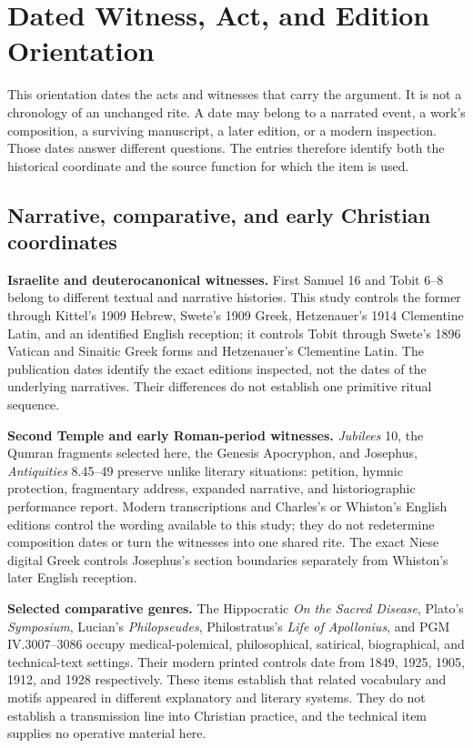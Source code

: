 \section{Dated Witness, Act, and Edition Orientation}

This orientation dates the acts and witnesses that carry the argument. It is
not a chronology of an unchanged rite. A date may belong to a narrated event,
a work's composition, a surviving manuscript, a later edition, or a modern
inspection. Those dates answer different questions. The entries therefore
identify both the historical coordinate and the source function for which the
item is used.

\subsection{Narrative, comparative, and early Christian coordinates}

\noindent\textbf{Israelite and deuterocanonical witnesses.}
First Samuel 16 and Tobit 6--8 belong to different textual and narrative
histories. This study controls the former through Kittel's 1909 Hebrew,
Swete's 1909 Greek, Hetzenauer's 1914 Clementine Latin, and an identified
English reception; it controls Tobit through Swete's 1896 Vatican and Sinaitic
Greek forms and Hetzenauer's Clementine Latin. The publication dates identify
the exact editions inspected, not the dates of the underlying narratives.
Their differences do not establish one primitive ritual sequence.

\medskip\noindent\textbf{Second Temple and early Roman-period witnesses.}
\emph{Jubilees} 10, the Qumran fragments selected here, the Genesis
Apocryphon, and Josephus, \emph{Antiquities} 8.45--49 preserve unlike literary
situations: petition, hymnic protection, fragmentary address, expanded
narrative, and historiographic performance report. Modern transcriptions and
Charles's or Whiston's English editions control the wording available to this
study; they do not redetermine composition dates or turn the witnesses into
one shared rite. The exact Niese digital Greek controls Josephus's section
boundaries separately from Whiston's later English reception.

\medskip\noindent\textbf{Selected comparative genres.}
The Hippocratic \emph{On the Sacred Disease}, Plato's \emph{Symposium},
Lucian's \emph{Philopseudes}, Philostratus's \emph{Life of Apollonius}, and
PGM IV.3007--3086 occupy medical-polemical, philosophical, satirical,
biographical, and technical-text settings. Their modern printed controls date
from 1849, 1925, 1905, 1912, and 1928 respectively. These items establish
that related vocabulary and motifs appeared in different explanatory and
literary systems. They do not establish a transmission line into Christian
practice, and the technical item supplies no operative material here.

